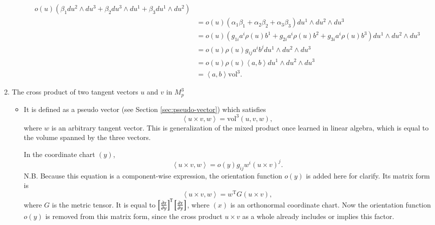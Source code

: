 \documentclass[11pt, a4paper]{book}
\begin{document}
\begin{enumerate}
\begin{itemize}
\begin{Proof}
\begin{align*}
          o(u)(\beta_1 du^2 \wedge du^3 + \beta_2 du^3 \wedge du^1 + \beta_3 du^1 \wedge du^2)
        \\
        &= o(u)(\alpha_1 \beta_1 + \alpha_2 \beta_2 + \alpha_3 \beta_3) du^1 \wedge du^2
          \wedge du^3 \\
        &= o(u)(g_{1i}a^i \rho(u) b^1 + g_{2i}a^i \rho(u)b^2 + g_{3i}a^i \rho(u)b^3) du^1
          \wedge du^2 \wedge du^3 \\
        &= o(u) \rho(u) g_{ij} a^i b^j du^1 \wedge du^2 \wedge du^3 \\
        &= o(u) \rho(u) \left\langle a,b \right\rangle du^1 \wedge du^2 \wedge du^3 \\
        &= \left\langle a,b \right\rangle \mathrm{vol}^3.
      \end{align*}
    \end{Proof}
  \end{itemize}
  
\item The cross product of two tangent vectors $u$ and $v$ in $M_p^3$
  \begin{itemize}
  \item It is defined as a pseudo vector (see Section \ref{sec:pseudo-vector}) which
    satisfies
    \begin{equation}
      \label{eq:cross-product}
      \left\langle u\times v, w \right\rangle = \mathrm{vol}^3(u,v,w),
    \end{equation}
    where $w$ is an arbitrary tangent vector. This is generalization of the mixed product
    once learned in linear algebra, which is equal to the volume spanned by the three
    vectors.

    In the coordinate chart $(y)$,
    \begin{equation*}
      \left\langle u\times v, w \right\rangle = o(y) g_{ij} w^i (u\times v)^j.
    \end{equation*}
    N.B. Because this equation is a component-wise expression, the orientation function
    $o(y)$ is added here for clarify. Its matrix form is
    \begin{equation*}
      \left\langle u\times v, w \right\rangle = w^{\mathrm{T}} G (u\times v),
    \end{equation*}
    where $G$ is the metric tensor. It is equal to
    $\left[ \frac{\partial x}{\partial y} \right]^{\mathrm{T}} \left[ \frac{\partial x}{\partial y}
    \right]$, where $(x)$ is an orthonormal coordinate chart. Now the orientation function
    $o(y)$ is removed from this matrix form, since the cross product $u\times v$ as a whole
    already includes or implies this factor.


\end{itemize}
\end{enumerate}
\end{document}
